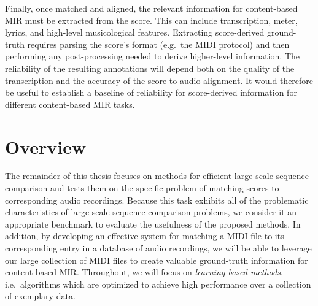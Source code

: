 Finally, once matched and aligned, the relevant information for content-based MIR must be extracted from the score.
This can include transcription, meter, lyrics, and high-level musicological features.
Extracting score-derived ground-truth requires parsing the score's format (e.g.\ the MIDI protocol) and then performing any post-processing needed to derive higher-level information.
The reliability of the resulting annotations will depend both on the quality of the transcription and the accuracy of the score-to-audio alignment.
It would therefore be useful to establish a baseline of reliability for score-derived information for different content-based MIR tasks.

\section{Overview}

The remainder of this thesis focuses on methods for efficient large-scale sequence comparison and tests them on the specific problem of matching scores to corresponding audio recordings.
Because this task exhibits all of the problematic characteristics of large-scale sequence comparison problems, we consider it an appropriate benchmark to evaluate the usefulness of the proposed methods.
In addition, by developing an effective system for matching a MIDI file to its corresponding entry in a database of audio recordings, we will be able to leverage our large collection of MIDI files to create valuable ground-truth information for content-based MIR.
Throughout, we will focus on {\em learning-based methods}, i.e.\ algorithms which are optimized to achieve high performance over a collection of exemplary data.

